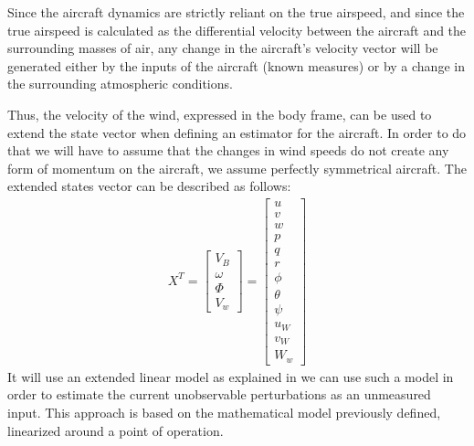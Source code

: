 \documentclass[twocolumn,showpacs,
    nofootinbib,aps,superscriptaddress,
    eqsecnum,prd,showkeys,10pt,floatfix]{revtex4}
\begin{document}
\par
Since the aircraft dynamics are strictly reliant on the true airspeed, and
since the true airspeed is calculated as the differential velocity between the
aircraft and the surrounding masses of air, any change in the aircraft's
velocity vector will be generated either by the inputs of the aircraft (known
measures) or by a change in the surrounding atmospheric conditions.
\par
Thus, the velocity of the wind, expressed in the body frame, can be used to
extend the state vector when defining an estimator for the aircraft. In order
to do that we will have to assume that the changes in wind speeds do not create
any form of momentum on the aircraft, we assume perfectly symmetrical aircraft.
The extended states vector can be described as follows:
\begin{align}
    X^T={\begin{bmatrix}
             V_B     \\
             \omega  \\
             \varPhi \\
             V_w
         \end{bmatrix}}
        ={\begin{bmatrix}
                  u      \\
                  v      \\
                  w      \\
                  p      \\
                  q      \\
                  r      \\
                  \phi   \\
                  \theta \\
                  \psi   \\
                  u_W    \\
                  v_W    \\
                  W_w
              \end{bmatrix}}
    \label{ExtendedSystemStates}
\end{align}
It will use an extended linear model as explained in {\cite{state_estimation}} we can use such a model in order to estimate the current unobservable perturbations as an unmeasured input.
This approach is based on the mathematical model previously defined, linearized around a point of operation.

\end{document}
